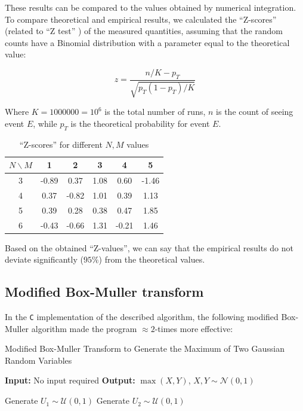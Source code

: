 \documentclass{article}
\theoremstyle{definition}
\begin{document}
\begin{appendices}
These results can be compared to the values obtained by numerical integration.
To compare theoretical and empirical results, we calculated the ``Z-scores'' (related to ``Z test'' \cite{book:StatisticsIntro}) of the measured quantities, assuming that the random counts have a Binomial distribution with a parameter equal to the theoretical value:

\begin{equation}
    z = \frac{n/K-p_T}{\sqrt{p_T(1-p_T)/K}}
\end{equation}

Where $K=1000000=10^6$ is the total number of runs, $n$ is the count of seeing event $E$, while $p_T$ is the theoretical probability for event $E$.

\begin{table}[H]
\centering
\begin{tabular}{|c|c|c|c|c|c|}
\hline
$N \backslash M$ & 1 & 2 & 3 & 4 & 5 \\ \hline
3 & -0.89 & 0.37 & 1.08 & 0.60 & -1.46 \\ \hline
4 & 0.37 & -0.82 & 1.01 & 0.39 & 1.13 \\ \hline
5 & 0.39 & 0.28 & 0.38 & 0.47 & 1.85 \\ \hline
6 & -0.43 & -0.66 & 1.31 & -0.21 & 1.46 \\ \hline
\end{tabular}
\caption{``Z-scores'' for different $N, M$ values}
\end{table}

Based on the obtained ``Z-values'', we can say that the empirical results do not deviate significantly ($95\%$) from the theoretical values.

\subsection{Modified Box-Muller transform}

In the \texttt{C} implementation of the described algorithm, the following modified Box-Muller algorithm made the program $\approx 2$-times more effective:

\begin{algorithm}[H]
\caption{Modified Box-Muller Transform to Generate the Maximum of Two Gaussian Random Variables}
\begin{algorithmic}[1]
\State \textbf{Input:} No input required
\State \textbf{Output:} $\max(X,Y)$,  $X, Y \sim \mathcal{N}(0, 1)$

\State Generate $U_1 \sim \mathcal{U}(0, 1)$
\State Generate $U_2 \sim \mathcal{U}(0, 1)$


\end{algorithmic}
\end{algorithm}
\end{appendices}
\end{document}
